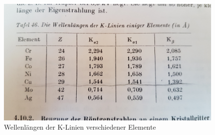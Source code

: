 	\begin{figure}[htb]
		\centering
		\includegraphics[scale=0.12]{images/lambda-data.jpg}
		\caption{Wellenlängen der K-Linien verschiedener Elemente}
		\label{fig:lambda-data}
	\end{figure}

